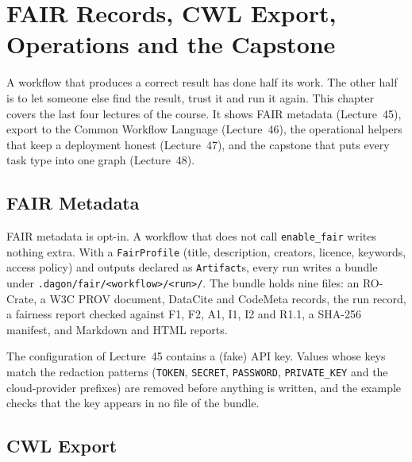 \chapter{FAIR Records, CWL Export, Operations and the Capstone}
\label{ch:fair-cwl}

A workflow that produces a correct result has done half its work. The other
half is to let someone else find the result, trust it and run it again. This
chapter covers the last four lectures of the course. It shows FAIR metadata
(Lecture~45), export to the Common Workflow Language (Lecture~46), the
operational helpers that keep a deployment honest (Lecture~47), and the
capstone that puts every task type into one graph (Lecture~48).

\section{FAIR Metadata}

FAIR metadata is opt-in. A workflow that does not call \texttt{enable\_fair}
writes nothing extra. With a \texttt{FairProfile} (title, description,
creators, licence, keywords, access policy) and outputs declared as
\texttt{Artifact}s, every run writes a bundle under
\texttt{.dagon/fair/<workflow>/<run>/}. The bundle holds nine files: an
RO-Crate, a W3C PROV document, DataCite and CodeMeta records, the run record,
a fairness report checked against F1, F2, A1, I1, I2 and R1.1, a SHA-256
manifest, and Markdown and HTML reports.





\begin{cautionbox}
The configuration of Lecture~45 contains a (fake) API key. Values whose keys
match the redaction patterns (\texttt{TOKEN}, \texttt{SECRET},
\texttt{PASSWORD}, \texttt{PRIVATE\_KEY} and the cloud-provider prefixes) are
removed before anything is written, and the example checks that the key
appears in no file of the bundle.
\end{cautionbox}

\section{CWL Export}

